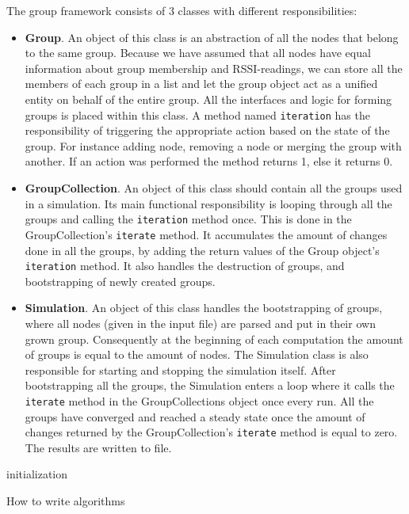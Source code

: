 The group framework consists of 3 classes with different responsibilities:
\begin{itemize}
	\item \textbf{Group}. An object of this class is an abstraction of all the nodes that belong to the same group. Because we have assumed that all nodes have equal
	information about group membership and RSSI-readings, we can store all the members of each group in a list and let the group object act as a unified entity on
	behalf of the entire group. All the interfaces and logic for forming groups is placed within this class. A method named \verb|iteration|
	has the responsibility of triggering the appropriate action based on the state of the group. For instance adding node, removing a node or merging the group
		with another. If an action was performed the method returns 1, else it returns 0. 

	\item \textbf{GroupCollection}. An object of this class should contain all the groups used in a simulation. Its main functional responsibility is looping through all the groups
	and calling the \verb|iteration| method once. This is done in the GroupCollection's \verb|iterate| method. It accumulates the amount of changes done in all the groups,
	by adding the return values of the Group object's \verb|iteration| method. It also handles the destruction of groups, and bootstrapping of newly created groups.

	\item \textbf{Simulation}. An object of this class handles the bootstrapping of groups, where all nodes (given in the input file) are parsed and
	put in their own grown group. Consequently at the beginning of each computation the amount of groups is equal to the amount of nodes.
	The Simulation class is also responsible for starting and stopping the simulation itself. After bootstrapping all the groups, the Simulation enters a loop
	where it calls the \verb|iterate| method in the GroupCollections object once every run. All the groups have converged and reached a steady state 
	once the amount of changes returned by the GroupCollection's \verb|iterate| method is equal to zero. The results are written to file.

\end{itemize}
\begin{algorithm}[H]
			initialization\;
			\caption{How to write algorithms}
\end{algorithm}

